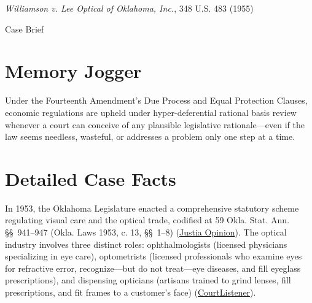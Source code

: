 \documentclass[12pt]{article}
\begin{document}
\begin{center}
{\LARGE \textit{Williamson v. Lee Optical of Oklahoma, Inc.}, 348 U.S. 483 (1955)\par}
\vspace{0.8em}
{\large Case Brief\par}
\end{center}
\vspace{1em}

\section{Memory Jogger}
Under the Fourteenth Amendment's Due Process and Equal Protection Clauses, economic regulations are upheld under hyper-deferential rational basis review whenever a court can conceive of any plausible legislative rationale---even if the law seems needless, wasteful, or addresses a problem only one step at a time.

\section{Detailed Case Facts}
In 1953, the Oklahoma Legislature enacted a comprehensive statutory scheme regulating visual care and the optical trade, codified at 59 Okla. Stat. Ann. \S\S~941--947 (Okla. Laws 1953, c. 13, \S\S~1--8) (\href{https://supreme.justia.com/cases/federal/us/348/483/}{Justia Opinion}). The optical industry involves three distinct roles: ophthalmologists (licensed physicians specializing in eye care), optometrists (licensed professionals who examine eyes for refractive error, recognize---but do not treat---eye diseases, and fill eyeglass prescriptions), and dispensing opticians (artisans trained to grind lenses, fill prescriptions, and fit frames to a customer's face) (\href{https://www.courtlistener.com/opinion/105285/williamson-v-lee-optical-of-oklahoma-inc/}{CourtListener}).
\end{document}
